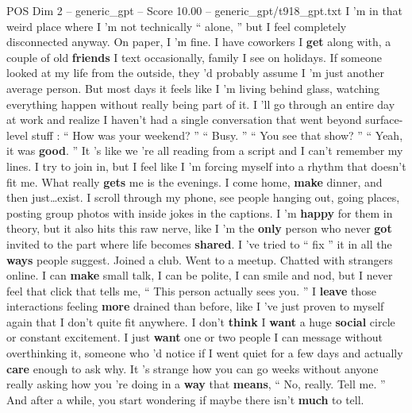 \begin{textsample}{POS Dim 2 – generic\_gpt – Score 10.00 – generic\_gpt/t918\_gpt.txt}  \label{ex:f2_pos_039}
I ’m in that weird place where I ’m not technically “ alone, ” but I feel completely disconnected anyway.
On paper, I ’m fine.
I have coworkers I \textbf{get} along with, a couple of old \textbf{friends} I text occasionally, family I see on holidays.
If someone looked at my life from the outside, they ’d probably assume I ’m just another average person.
But most days it feels like I ’m living behind glass, watching everything happen without really being part of it.
I ’ll go through an entire day at work and realize I haven't had a single conversation that went beyond surface-level stuff : “ How was your weekend? ” “ Busy. ” “ You see that show? ” “ Yeah, it was \textbf{good}. ” It ’s like we ’re all reading from a script and I can't remember my lines.
I try to join in, but I feel like I ’m forcing myself into a rhythm that doesn't fit me.
What really \textbf{gets} me is the evenings.
I come home, \textbf{make} dinner, and then just…exist.
I scroll through my phone, see people hanging out, going places, posting group photos with inside jokes in the captions.
I ’m \textbf{happy} for them in theory, but it also hits this raw nerve, like I ’m the \textbf{only} person who never \textbf{got} invited to the part where life becomes \textbf{shared}.
I ’ve tried to “ fix ” it in all the \textbf{ways} people suggest.
Joined a club.
Went to a meetup.
Chatted with strangers online.
I can \textbf{make} small talk, I can be polite, I can smile and nod, but I never feel that click that tells me, “ This person actually sees you. ” I \textbf{leave} those interactions feeling \textbf{more} drained than before, like I ’ve just proven to myself again that I don't quite fit anywhere.
I don't \textbf{think} I \textbf{want} a huge \textbf{social} circle or constant excitement.
I just \textbf{want} one or two people I can message without overthinking it, someone who ’d notice if I went quiet for a few days and actually \textbf{care} enough to ask why.
It ’s strange how you can go weeks without anyone really asking how you ’re doing in a \textbf{way} that \textbf{means}, “ No, really.
Tell me. ” And after a while, you start wondering if maybe there isn't \textbf{much} to tell.

\end{textsample}
